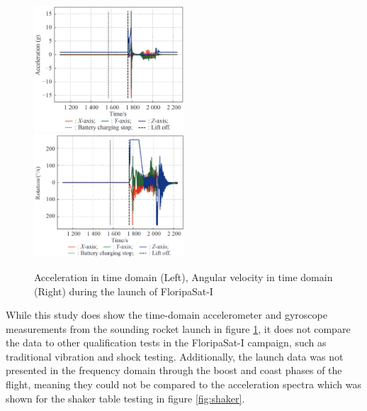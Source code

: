 \documentclass{report}
\begin{document}
\begin{figure}[H]
  \includegraphics[width=0.5\textwidth]{images/floripa-accel.png}
  \includegraphics[width=0.5\textwidth]{images/floripa-rot.png}
  \caption{Acceleration in time domain (Left), Angular velocity in time domain (Right) during the launch of FloripaSat-I \cite{9316404}}
  \label{fig:accel-rot}
\end{figure}

While this study does show the time-domain accelerometer and gyroscope measurements from the sounding rocket launch in figure \ref{fig:accel-rot}, it does not compare the data to other qualification tests in the FloripaSat-I campaign, such as traditional vibration and shock testing. Additionally, the launch data was not presented in the frequency domain through the boost and coast phases of the flight, meaning they could not be compared to the acceleration spectra which was shown for the shaker table testing in figure \ref{fig:shaker}.
\end{document}
